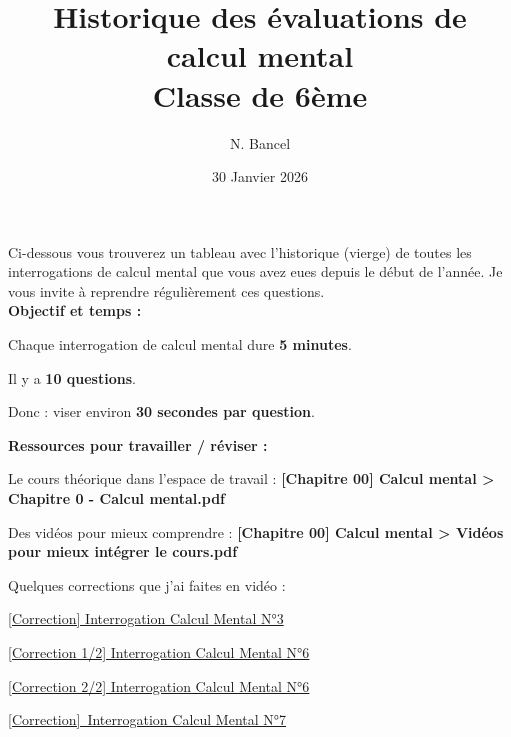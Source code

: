 \documentclass[answers]{exam}
\title{Historique des évaluations de calcul mental \\ Classe de 6ème}
\author{N. Bancel}
\date{30 Janvier 2026}
\begin{document}
{\let\newpage\relax\maketitle}

\begin{Indication}
Ci-dessous vous trouverez un tableau avec l'historique (vierge) de toutes les interrogations de calcul mental que vous avez eues depuis le début de l'année. Je vous invite à reprendre régulièrement ces questions.
\vspace{1em} \\
\textbf{Objectif et temps :}
\begin{compactitem}
  \item Chaque interrogation de calcul mental dure \textbf{5 minutes}.
  \item Il y a \textbf{10 questions}.
  \item Donc : viser environ \textbf{30 secondes par question}.
\end{compactitem}
\vspace{1em}
\textbf{Ressources pour travailler / réviser :}
\begin{compactitem}
  \item Le cours théorique dans l'espace de travail : \textbf{[Chapitre 00] Calcul mental > Chapitre 0 - Calcul mental.pdf} 
  \item Des vidéos pour mieux comprendre : \textbf{[Chapitre 00] Calcul mental > Vidéos pour mieux intégrer le cours.pdf} 
  \item Quelques corrections que j'ai faites en vidéo : 
  \begin{compactitem}
      \item \href{https://www.loom.com/share/60ca42f3b2f841c4945bbd4c3c03bcf6}{[Correction] Interrogation Calcul Mental N°3}
      \item \href{https://www.loom.com/share/14d597a7dda741c298b08c6ffd6b81a5}{[Correction 1/2] Interrogation Calcul Mental N°6}
      \item \href{https://www.loom.com/share/0d3d3eea160e4fa6aa2b5d8d9f4a059e}{[Correction 2/2] Interrogation Calcul Mental N°6}
      \item \href{https://www.loom.com/share/4c39cf223f4946aaacf99402cb01882a}{[Correction] Interrogation Calcul Mental N°7}
  \end{compactitem}
  
\end{compactitem}

\end{Indication}

\vspace{3mm}

\renewcommand{\arraystretch}{1.7}
\end{document}
